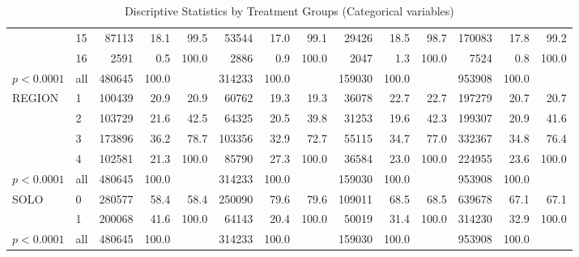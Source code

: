 \begin{table}[ht]
{\begin{tabular}{ll|rrr|rrr|rrr|rrr}
   & 15 & 87113 & 18.1 & 99.5 & 53544 & 17.0 & 99.1 & 29426 & 18.5 & 98.7 & 170083 & 17.8 & 99.2 \\ 
   & 16 & 2591 & 0.5 & 100.0 & 2886 & 0.9 & 100.0 & 2047 & 1.3 & 100.0 & 7524 & 0.8 & 100.0 \\ 
   \hline
$p< 0.0001$ & all & 480645 & 100.0 &  & 314233 & 100.0 &  & 159030 & 100.0 &  & 953908 & 100.0 &  \\ 
   \hline
\hline
REGION & 1 & 100439 & 20.9 & 20.9 & 60762 & 19.3 & 19.3 & 36078 & 22.7 & 22.7 & 197279 & 20.7 & 20.7 \\ 
   & 2 & 103729 & 21.6 & 42.5 & 64325 & 20.5 & 39.8 & 31253 & 19.6 & 42.3 & 199307 & 20.9 & 41.6 \\ 
   & 3 & 173896 & 36.2 & 78.7 & 103356 & 32.9 & 72.7 & 55115 & 34.7 & 77.0 & 332367 & 34.8 & 76.4 \\ 
   & 4 & 102581 & 21.3 & 100.0 & 85790 & 27.3 & 100.0 & 36584 & 23.0 & 100.0 & 224955 & 23.6 & 100.0 \\ 
   \hline
$p< 0.0001$ & all & 480645 & 100.0 &  & 314233 & 100.0 &  & 159030 & 100.0 &  & 953908 & 100.0 &  \\ 
   \hline
\hline
SOLO & 0 & 280577 & 58.4 & 58.4 & 250090 & 79.6 & 79.6 & 109011 & 68.5 & 68.5 & 639678 & 67.1 & 67.1 \\ 
   & 1 & 200068 & 41.6 & 100.0 & 64143 & 20.4 & 100.0 & 50019 & 31.4 & 100.0 & 314230 & 32.9 & 100.0 \\ 
   \hline
$p< 0.0001$ & all & 480645 & 100.0 &  & 314233 & 100.0 &  & 159030 & 100.0 &  & 953908 & 100.0 &  \\ 
   \hline
\hline
\end{tabular}
}
\caption{Discriptive Statistics by Treatment Groups (Categorical variables)} 
\label{tab:descriptive.1}
\end{table}
